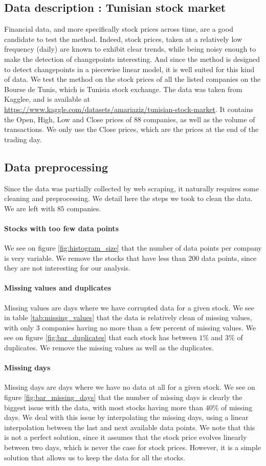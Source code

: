 \documentclass[11pt]{article}
\begin{document}
\subsection{Data description : Tunisian stock market}
Financial data, and more specifically stock prices across time, are a good candidate to test the method. Indeed, stock prices, taken at a relatively low frequency (daily) are known to exhibit clear trends, while being noisy enough to make the detection of changepoints interesting. And since the method is designed to detect changepoints in a piecewise linear model, it is well suited for this kind of data.
\jump
We test the method on the stock prices of all the listed companies on the Bourse de Tunis, which is Tunisia stock exchange. The data was taken from Kagglee, and is available at \url{https://www.kaggle.com/datasets/amariaziz/tunisian-stock-market}. It contains the Open, High, Low and Close prices of 88 companies, as well as the volume of transactions. We only use the Close prices, which are the prices at the end of the trading day.
\subsection{Data preprocessing}
Since the data was partially collected by web scraping, it naturally requires some cleaning and preprocessing. We detail here the steps we took to clean the data. We are left with $85$ companies.
\paragraph*{Stocks with too few data points} We see on figure \ref{fig:histogram_size} that the number of data points per company is very variable. We remove the stocks that have less than $200$ data points, since they are not interesting for our analysis.
\paragraph*{Missing values and duplicates} Missing values are days where we have corrupted data for a given stock. We see in table \ref{tab:missing_values} that the data is relatively clean of missing values, with only $3$ companies having no more than a few percent of missing values. We see on figure \ref{fig:bar_duplicates} that each stock has between $1\%$ and $3\%$ of duplicates. We remove the missing values as well as the duplicates.
\paragraph*{Missing days} Missing days are days where we have no data at all for a given stock. We see on figure \ref{fig:bar_missing_days} that the number of missing days is clearly the biggest issue with the data, with most stocks having more than $40\%$ of missing days. We deal with this issue by interpolating the missing days, using a linear interpolation between the last and next available data points. We note that this is not a perfect solution, since it assumes that the stock price evolves linearly between two days, which is never the case for stock prices. However, it is a simple solution that allows us to keep the data for all the stocks.
\end{document}
